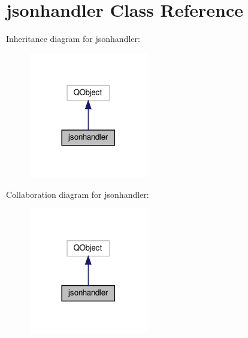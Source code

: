 \hypertarget{classjsonhandler}{}\section{jsonhandler Class Reference}
\label{classjsonhandler}


Inheritance diagram for jsonhandler\+:
\nopagebreak
\begin{figure}[H]
\begin{center}
\leavevmode
\includegraphics[width=146pt]{classjsonhandler__inherit__graph}
\end{center}
\end{figure}


Collaboration diagram for jsonhandler\+:
\nopagebreak
\begin{figure}[H]
\begin{center}
\leavevmode
\includegraphics[width=146pt]{classjsonhandler__coll__graph}
\end{center}
\end{figure}
